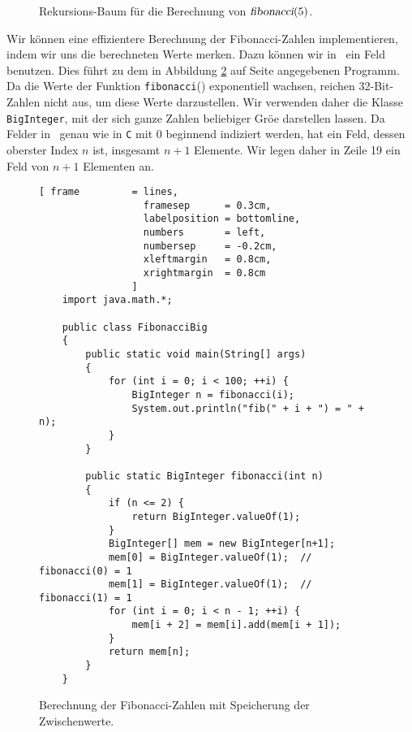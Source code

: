 \begin{figure}[!ht]
  \centering
  \caption{Rekursions-Baum f\"ur die Berechnung von $\textsl{fibonacci}(5)$.}
  \label{fig:fibonacci.eps}
\end{figure}


Wir k\"onnen eine effizientere Berechnung der Fibonacci-Zahlen implementieren, indem wir
uns die berechneten Werte merken.  Dazu k\"onnen wir in \Java\ ein Feld benutzen.
 Dies f\"uhrt zu dem in Abbildung \ref{fig:fibonacci-dynamic}
auf Seite \pageref{fig:fibonacci-dynamic} angegebenen Programm.
Da die Werte der Funktion \texttt{fibonacci}() exponentiell wachsen, reichen 32-Bit-Zahlen
nicht aus, um diese Werte darzustellen.  Wir verwenden daher die Klasse
\texttt{BigInteger}, mit der sich ganze Zahlen beliebiger Gr\"o\3e darstellen lassen.
Da Felder in \Java\ genau wie in \texttt{C} mit 0 beginnend indiziert werden,
hat ein Feld, dessen oberster Index $n$ ist, insgesamt $n+1$ Elemente.  Wir legen daher in
Zeile 19 ein Feld von $n+1$ Elementen an.

\begin{figure}[!h]
  \centering
\begin{Verbatim}[ frame         = lines, 
                  framesep      = 0.3cm, 
                  labelposition = bottomline,
                  numbers       = left,
                  numbersep     = -0.2cm,
                  xleftmargin   = 0.8cm,
                  xrightmargin  = 0.8cm
                ]
    import java.math.*;
    
    public class FibonacciBig
    {
        public static void main(String[] args) 
        {
            for (int i = 0; i < 100; ++i) {
                BigInteger n = fibonacci(i);
                System.out.println("fib(" + i + ") = " + n);
            }
        }
        
        public static BigInteger fibonacci(int n) 
        {
            if (n <= 2) {
                return BigInteger.valueOf(1);
            }
            BigInteger[] mem = new BigInteger[n+1];
            mem[0] = BigInteger.valueOf(1);  // fibonacci(0) = 1
            mem[1] = BigInteger.valueOf(1);  // fibonacci(1) = 1
            for (int i = 0; i < n - 1; ++i) {
                mem[i + 2] = mem[i].add(mem[i + 1]);
            }
            return mem[n];
        }
    }
\end{Verbatim}
\vspace*{-0.3cm}
  \caption{Berechnung der Fibonacci-Zahlen mit Speicherung der Zwischenwerte.}
  \label{fig:fibonacci-dynamic}
\end{figure} 



